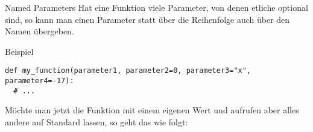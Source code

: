 \begin{fragile}
	
\begin{block}{Named Parameters}
\vspace{2pt}
Hat eine Funktion viele Parameter, von denen etliche optional sind, so kann man einen Parameter statt über die Reihenfolge auch über den Namen übergeben. 
\end{block}

\pause 
\vspace{12pt}

\begin{exampleblock}{Beispiel}
\vspace{2pt}

\begin{verbatim}
def my_function(parameter1, parameter2=0, parameter3="x", parameter4=-17):
  # ... 
\end{verbatim}
Möchte man jetzt die Funktion mit einem eigenen Wert  und  aufrufen aber alles andere auf Standard lassen, so geht das wie folgt: 

\end{exampleblock}

	
\end{fragile}










